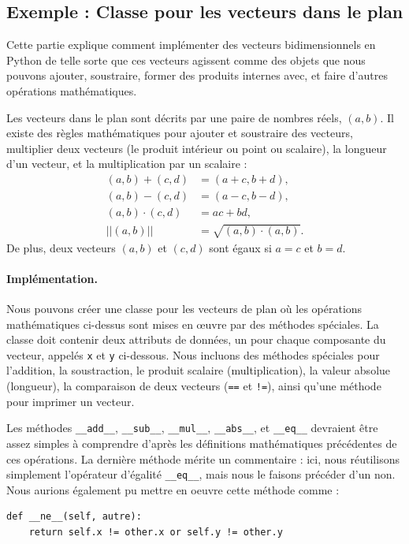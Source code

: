 \documentclass[a4paper,11pt]{article}
\theoremstyle{mytheor}
\begin{document}
\noindent
\subsection{Exemple : Classe pour les vecteurs dans le plan}
Cette partie explique comment implémenter des vecteurs bidimensionnels en Python de telle sorte que ces vecteurs agissent comme des objets que nous pouvons ajouter, soustraire, former des produits internes avec, et faire d'autres opérations mathématiques.

Les vecteurs dans le plan sont décrits par une paire de nombres réels, $(a,b)$. Il existe des règles mathématiques pour ajouter et soustraire des vecteurs, multiplier deux vecteurs (le produit intérieur ou point ou scalaire), la longueur d'un vecteur, et la multiplication par un scalaire :
\begin{align}
(a,b) + (c,d) &= (a+c, b+d),\\
(a,b) - (c,d) &= (a-c, b-d),\\
(a,b)\cdot(c,d) &= ac + bd,\\
||(a,b)|| &= \sqrt{(a,b)\cdot(a,b)}.
\end{align}
De plus, deux vecteurs $(a,b)$ et $(c,d)$ sont égaux si $a=c$ et $b=d$.
\paragraph{Implémentation.}
Nous pouvons créer une classe pour les vecteurs de plan où les opérations mathématiques ci-dessus sont mises en œuvre par des méthodes spéciales. La classe doit contenir deux attributs de données, un pour chaque composante du vecteur, appelés \texttt{x} et \texttt{y} ci-dessous. Nous incluons des méthodes spéciales pour l'addition, la soustraction, le produit scalaire (multiplication), la valeur absolue (longueur), la comparaison de deux vecteurs (\texttt{==} et \Verb?!=?), ainsi qu'une méthode pour imprimer un vecteur.



Les méthodes \Verb!__add__!, \Verb!__sub__!, \Verb!__mul__!, \Verb!__abs__!, et \Verb!__eq__! devraient être assez simples à comprendre d'après les définitions mathématiques précédentes de ces opérations. La dernière méthode mérite un commentaire : ici, nous réutilisons simplement l'opérateur d'égalité \Verb!__eq__!, mais nous le faisons précéder d'un non. Nous aurions également pu mettre en oeuvre cette méthode comme :

\begin{lstlisting}
def __ne__(self, autre):
	return self.x != other.x or self.y != other.y
\end{lstlisting}
\end{document}
